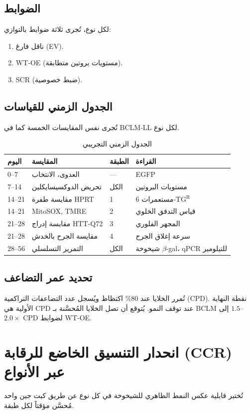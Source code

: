\documentclass[11pt,a4paper]{article}
\begin{document}
	\subsection{الضوابط}
	لكل نوع، تُجرى ثلاثة ضوابط بالتوازي:
	\begin{enumerate}
		\item ناقل فارغ (EV).
		\item WT‑OE (مستويات بروتين متطابقة).
		\item SCR (ضبط خصوصية).
	\end{enumerate}
	
	\subsection{الجدول الزمني للقياسات}
	تُجرى نفس المقايسات الخمسة كما في BCLM‑LL لكل نوع.
	
	\begin{table}[H]
		\centering
		\caption{الجدول الزمني التجريبي}
		\label{tab:schedule}
		\begin{tabular}{@{}llll@{}}
			\toprule
			\textbf{اليوم} & \textbf{المقايسة} & \textbf{الطبقة} & \textbf{القراءة} \\
			\midrule
			0–7   & العدوى، الانتخاب & --- & EGFP \\
			7–14  & تحريض الدوكسيسايكلين & الكل & مستويات البروتين \\
			14–21 & مقايسة طفرة HPRT & 1 & مستعمرات 6‑TG\(^{\mathrm{R}}\) \\
			14–21 & MitoSOX, TMRE & 2 & قياس التدفق الخلوي \\
			21–28 & مقايسة إدراج HTT‑Q72 & 3 & المجهر الفلوري \\
			21–28 & مقايسة الجرح بالخدش & 4 & سرعة إغلاق الجرح \\
			28–56 & التمرير التسلسلي & الكل & شيخوخة \(\beta\)-gal، qPCR للتيلومير \\
			\bottomrule
		\end{tabular}
	\end{table}
	
	\subsection{تحديد عمر التضاعف}
	تُمرر الخلايا عند 80\% اكتظاظ ويُسجل عدد التضاعفات التراكمية (CPD). نقطة النهاية الأولية هي CPD عند توقف النمو. يُتوقع أن تصل الخلايا المُحسَّنة بـ BCLM إلى \(1.5\)–\(2.0\times\) CPD لضوابط WT‑OE.
	
	\section{انحدار التنسيق الخاضع للرقابة (CCR) عبر الأنواع}
	\label{sec:CCR}
	تُختبر قابلية عكس النمط الظاهري للشيخوخة في كل نوع عن طريق كبت جين واحد مُحسَّن مؤقتاً لكل طبقة.
	
\end{document}
